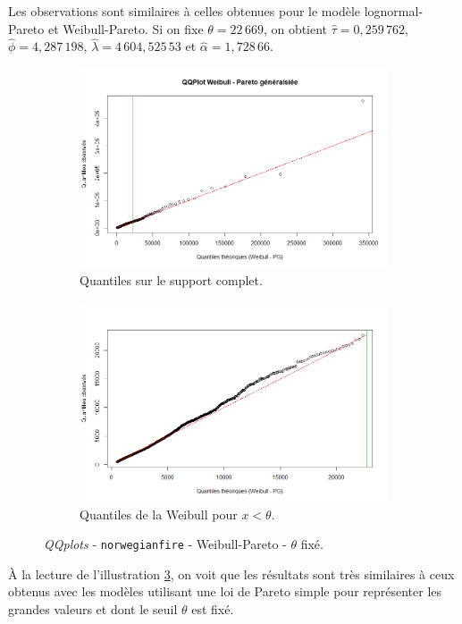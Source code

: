 		Les observations sont similaires à celles obtenues pour le modèle lognormal-Pareto et Weibull-Pareto.
		Si on fixe $\theta = 22\,669$, on obtient $\hat{\tau} =0,259\,762$, $\hat{\phi}=4,287\,198$, $\hat{\lambda}=4\,604,525\,53$ et $\hat{\alpha} = 1,728\,66$.
		
		\begin{figure}[H]
			\begin{center}
				\begin{subfigure}[b]{0.45\textwidth}
					\includegraphics[scale=0.35]{Graphiques/QQ_Wei_PG_choix} 
					\caption{Quantiles sur le support complet.} \label{QQplot_Wei_PG_choix}
				\end{subfigure}
				\begin{subfigure}[b]{0.4\textwidth}
					\includegraphics[scale=0.35]{Graphiques/QQ_Wei_PG_choix_t1} 
					\caption{Quantiles de la Weibull pour $x<\theta$.} \label{QQplot_Wei_PG_choix_2}
				\end{subfigure}
				\renewcommand{\figurename}{Illustration}
				\caption{\textit{QQplots} - \texttt{norwegianfire} - Weibull-Pareto - $\theta$ fixé.}\label{QQplot_Wei_PG_choix3}
			\end{center}
		\end{figure}
		À la lecture de l'illustration \ref{QQplot_Wei_PG_choix3}, on voit que les résultats sont très similaires à ceux obtenus avec les modèles utilisant une loi de Pareto simple pour représenter les grandes valeurs et dont le seuil $\theta$ est fixé.	
		
